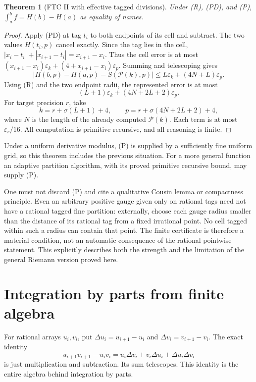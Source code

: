 \documentclass[11pt]{article}
\newtheorem{theorem}{Theorem}[section]
\theoremstyle{definition}
\newcommand{\eps}{\varepsilon}
\newcommand{\abs}[1]{\left|#1\right|}
\begin{document}
\begin{theorem}[FTC II with effective tagged divisions]\label{thm:taggedFTC}
Under (R), (PD), and (P),
\(\int_a^b f=H(b)-H(a)\) as equality of names.
\end{theorem}
\begin{proof}
Apply (PD) at tag \(t_i\) to both endpoints of its cell and subtract.
The two values \(H(t_i,p)\) cancel exactly.  Since the tag lies in the
cell,
\(\abs{x_i-t_i}+\abs{x_{i+1}-t_i}=x_{i+1}-x_i\).
Thus the cell error is at most
\((x_{i+1}-x_i)\eps_k+(4+x_{i+1}-x_i)\eps_p\).
Summing and telescoping gives
\begin{equation}
 \abs{H(b,p)-H(a,p)-S(\mathcal P(k),p)}
 \le L\eps_k+(4N+L)\eps_p.\label{eq:taggedfinite}
\end{equation}
Using (R) and the two endpoint radii, the represented error is at most
\[
 (L+1)\eps_k+(4N+2L+2)\eps_p.
\]
For target precision \(r\), take
\[
 k=r+\sigma(L+1)+4,\qquad
 p=r+\sigma(4N+2L+2)+4,
\]
where \(N\) is the length of the already computed
\(\mathcal P(k)\).  Each term is at most \(\eps_r/16\).
All computation is primitive recursive, and all reasoning is finite.
\end{proof}

Under a uniform derivative modulus, (P) is supplied by a sufficiently
fine uniform grid, so this theorem includes the previous situation.
For a more general function an adaptive partition algorithm, with its
proved primitive recursive bound, may supply (P).

One must not discard (P) and cite a qualitative Cousin lemma or compactness
principle.  Even an arbitrary positive gauge given only on rational
tags need not have a rational tagged fine partition: externally, choose
each gauge radius smaller than the distance of its rational tag from a
fixed irrational point.  No cell tagged within such a radius can contain
that point.  The finite certificate is therefore a material condition,
not an automatic consequence of the rational pointwise statement.
This explicitly describes both the strength and the limitation of the
general Riemann version proved here.

\section{Integration by parts from finite algebra}\label{sec:parts}

For rational arrays \(u_i,v_i\), put
\(\Delta u_i=u_{i+1}-u_i\) and \(\Delta v_i=v_{i+1}-v_i\).
The exact identity
\begin{equation}
 u_{i+1}v_{i+1}-u_iv_i
 =u_i\Delta v_i+v_i\Delta u_i+\Delta u_i\Delta v_i
 \label{eq:productfinite}
\end{equation}
is just multiplication and subtraction.  Its sum telescopes.  This
identity is the entire algebra behind integration by parts.
\end{document}
